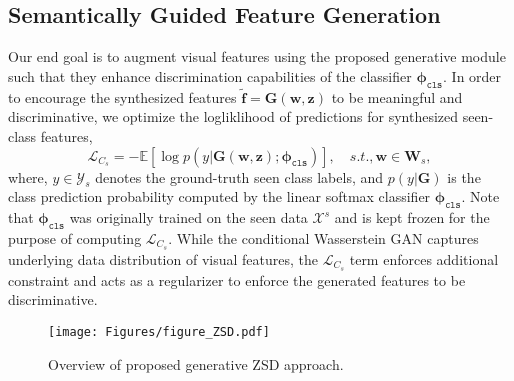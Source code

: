 \documentclass[runningheads]{llncs}
\begin{document}
\subsection{Semantically Guided Feature Generation}
Our end goal is to augment visual features using the proposed generative module such that they enhance discrimination capabilities of the classifier $\mathbf{\phi}_{\texttt{cls}}$. In order to encourage the synthesized features $\tilde{\mathbf{f}} = \mathbf{G}(\mathbf{w},\mathbf{z})$ to be meaningful and discriminative, we optimize the logliklihood of predictions for synthesized seen-class features,
\begin{equation}
    \mathcal{L}_{C_s} = - \mathbb{E}[\log p(y|\mathbf{G}(\mathbf{w},\mathbf{z}); \mathbf{\phi}_{\texttt{cls}})], \quad s.t., \mathbf{w} \in \mathbf{W}_s,
    \label{eqn: lcs}
\end{equation}
where, $y \in \mathcal{Y}_s$ denotes the ground-truth seen class labels, and $p(y|\mathbf{G})$ is the class prediction probability computed by the linear softmax classifier $\mathbf{\phi}_{\texttt{cls}}$. Note that $\mathbf{\phi}_{\texttt{cls}}$ was originally trained on the seen data $\mathcal{X}^s$ and is kept frozen for the purpose of computing $\mathcal{L}_{C_s}$. While the conditional Wasserstein GAN captures underlying data distribution of visual features, the $\mathcal{L}_{C_s}$ term enforces additional constraint and acts as a regularizer to enforce the generated features to be discriminative.

\begin{figure}[tp]
    \centering
    \texttt{[image: Figures/figure\_ZSD.pdf]}
    \caption{Overview of proposed generative ZSD approach.}
    \label{fig:main_fig}
\end{figure}
\end{document}
